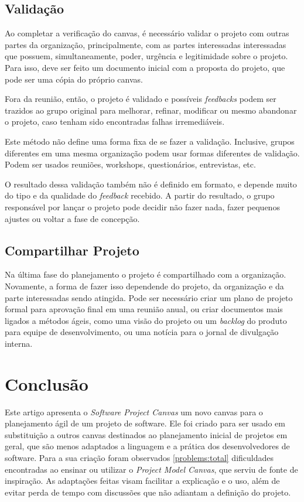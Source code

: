 \documentclass[a4]{report}
\begin{document}
\subsection{Validação}

Ao completar a verificação do canvas, é necessário validar o projeto com outras partes da organização, principalmente, com as partes interessadas interessadas que possuem, simultaneamente, poder, urgência e legitimidade sobre o projeto\citep{mitchell_toward_1997}. Para isso, deve ser feito um documento inicial com a proposta do projeto, que pode ser uma cópia do próprio canvas.

Fora da reunião, então, o projeto é validado e possíveis \textit{feedbacks} podem ser trazidos ao grupo original para melhorar, refinar, modificar ou mesmo abandonar o projeto, caso tenham sido encontradas falhas irremediáveis.


Este método não define uma forma fixa de se fazer a validação. Inclusive, grupos diferentes em uma mesma organização podem usar formas diferentes de validação. Podem ser usados reuniões, workshops, questionários, entrevistas, etc.

O resultado dessa validação também não é definido em formato, e depende muito do tipo e da qualidade do \textit{feedback} recebido. A partir do resultado, o grupo responsável por lançar o projeto pode decidir não fazer nada, fazer pequenos ajustes ou voltar a fase de concepção.

\subsection{Compartilhar Projeto}

Na última fase do planejamento o projeto é compartilhado com a organização. Novamente, a forma de fazer isso dependende do projeto, da organização e da parte interessadas sendo atingida.  Pode ser necessário criar um plano de projeto formal para aprovação final em uma reunião anual, ou criar documentos mais ligados a métodos ágeis, como uma  visão do projeto ou um \textit{backlog} do produto para equipe de desenvolvimento, ou uma notícia para o jornal de divulgação interna.






\section{Conclusão}

Este artigo apresenta o \textit{Software Project Canvas} um novo canvas para o planejamento ágil de um projeto de software. Ele foi criado para ser usado em substituição a outros canvas destinados ao planejamento inicial de projetos em geral, que são menos adaptados a linguagem e a prática dos desenvolvedores de software. Para a sua  criação foram observados \ref{problems:total} dificuldades encontradas ao ensinar ou utilizar o \textit{Project Model Canvas}, que serviu de fonte de inspiração. As adaptações feitas visam facilitar a explicação e o uso, além de evitar perda de tempo com discussões que não adiantam a definição do projeto.
\end{document}
